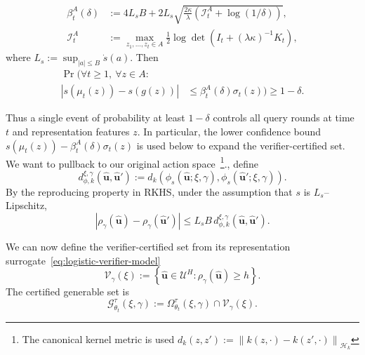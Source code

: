 \begin{itemize}[leftmargin=0pt, itemindent=0pt, label={}]
\begin{lemma}
\begin{align}
    \beta_t^A(\delta)
    &:=
    4L_sB+
    2L_s
    \sqrt{
    \frac{2\kappa}{\lambda}
    \left(\mathcal I_t^A+\log(1/\delta)\right)
    },
    \label{eq:logistic-confidence-radius}\\
    \mathcal I_t^A
    &:=
    \max_{z_1,\ldots,z_t\in A}
    \frac{1}{2}
    \log\det\left(
    I_t+(\lambda\kappa)^{-1}K_t
    \right),
    \label{eq:maximum-information-gain}
\end{align}
where \(L_s:=\sup_{|a|\le B}\dot{s}(a)\). Then
\begin{equation}
    \begin{aligned}
        \Pr\bigl(\forall t\ge1,\ \forall z\in A:\\
        \left|s(\mu_t(z))-s(g(z))\right|
        &\le\beta_t^A(\delta)\sigma_t(z)
        \bigr)
        \ge1-\delta.
    \end{aligned}
    \label{eq:anytime-logistic-confidence}
\end{equation}
\end{lemma}
Thus a single event of probability at least \(1-\delta\) controls all
query rounds at time $t$ and representation features $z$. In particular, the lower
confidence bound
\(
s(\mu_t(z))-\beta_t^A(\delta)\sigma_t(z)
\)
is used below to expand the verifier-certified set. We want to pullback to our original action space~\footnote{The canonical kernel metric is used $d_k(z,z')
:=
\left\|
k(z,\cdot)-k(z',\cdot)
\right\|_{\mathcal H_k}$}., define
\begin{equation}
d_{\phi,k}^{\xi,\gamma}
(\hat{\mathbf u},\hat{\mathbf u}')
:=
d_k\!\left(
\phi_s(\hat{\mathbf u};\xi,\gamma),
\phi_s(\hat{\mathbf u}';\xi,\gamma)
\right).
\label{eq:pullback-kernel-metric}
\end{equation}
By the reproducing property in RKHS, under the assumption that $s$ is $L_s$--Lipschitz,
\begin{equation}
\left|
\rho_\gamma(\hat{\mathbf u})
-\rho_\gamma(\hat{\mathbf u}')
\right|
\le
L_sB\,
d_{\phi,k}^{\xi,\gamma}
(\hat{\mathbf u},\hat{\mathbf u}').
\label{eq:rkhs-spatial-bound}
\end{equation}

We can now define the verifier-certified set from its representation surrogate~\eqref{eq:logistic-verifier-model}
\begin{equation}
\mathcal V_{\gamma}(\xi)
:=
\left\{
\hat{\mathbf u}\in\mathcal U^H:
\rho_\gamma(\hat{\mathbf u})\ge h
\right\}.
\label{eq:representation-valid-certified-set}
\end{equation}
The certified generable set is
\begin{equation}
\mathcal G_{\theta_t}^{\tau}(\xi,\gamma)
:=
\Omega_{\theta_t}^{\tau}(\xi,\gamma)
\cap
\mathcal V_\gamma(\xi).
\label{eq:certified-generable-set}
\end{equation}


\end{itemize}
